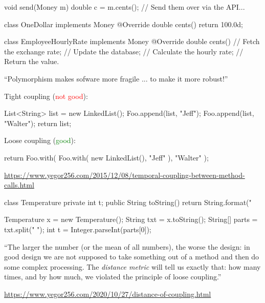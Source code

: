 \documentclass{article}
\begin{document}
\begin{multicols}{2}
{\scriptsize\begin{ffcode}
void send(Money m) {
  double c = m.cents();
  // Send them over via the API...
}

class OneDollar implements Money {
  @Override
  double cents() {
    return 100.0d;
  }
}
\end{ffcode}
}
\par\columnbreak\par
{\scriptsize\begin{ffcode}
class EmployeeHourlyRate
  implements Money {
  @Override
  double cents() {
    // Fetch the exchange rate;
    // Update the database;
    // Calculate the hourly rate;
    // Return the value.
  }
}
\end{ffcode}
}
\par
``Polymorphism makes sofware more fragile ... to make it more robust!''
\end{multicols}
\plush{}

\begin{multicols}{2}
Tight coupling (\textcolor{red}{not good}):\par
{\small\begin{ffcode}
List<String> list =
  new LinkedList();
Foo.append(list, "Jeff");
Foo.append(list, "Walter");
return list;
\end{ffcode}
}
\par\columnbreak\par
Loose coupling (\textcolor{green}{good}):\par
{\small\begin{ffcode}
return Foo.with(
  Foo.with(
    new LinkedList(),
    "Jeff"
  ),
  "Walter"
);
\end{ffcode}
}
\end{multicols}\par
{\scriptsize \url{https://www.yegor256.com/2015/12/08/temporal-coupling-between-method-calls.html}\par}
\plush{}

\begin{multicols}{2}
{\scriptsize\begin{ffcode}
class Temperature {
  private int t;
  public String toString() {
    return String.format("%
  }
}

Temperature x = new Temperature();
String txt = x.toString();
String[] parts = txt.split(" ");
int t = Integer.parseInt(parts[0]);
\end{ffcode}
}
\par\columnbreak\par
``The larger the number (or the mean of all numbers), the worse the design: in good design we are not supposed to take something out of a method and then do some complex processing. The \emph{distance metric} will tell us exactly that: how many times, and by how much, we violated the principle of loose coupling.''\par
{\scriptsize \url{https://www.yegor256.com/2020/10/27/distance-of-coupling.html}\par}
\end{multicols}
\plush{}
\end{document}
